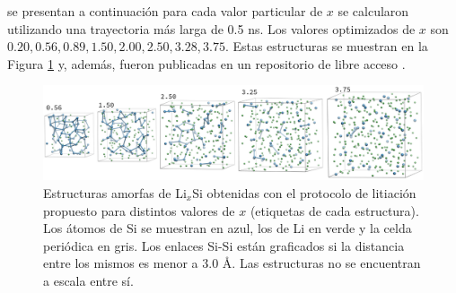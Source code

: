 se presentan a continuación para cada valor particular de $x$ se calcularon 
utilizando una trayectoria más larga de 0.5 ns. Los valores optimizados de $x$
son $0.20, 0.56, 0.89, 1.50, 2.00, 2.50, 3.28, 3.75$. Estas estructuras se 
muestran en la Figura \ref{fig:litiacion} y, además, fueron publicadas en un 
repositorio de libre acceso \cite{dftb_lisi_amorphous}.
\begin{figure}[h!]
    \centering
    \includegraphics[width=\textwidth]{Silicio/prediccion/metodos/litiacion.png}
    \caption{Estructuras amorfas de Li$_x$Si obtenidas con el protocolo de litiación
    propuesto para distintos valores de $x$ (etiquetas de cada estructura). Los 
    átomos de Si se muestran en azul, los de Li en verde y la celda periódica en 
    gris. Los enlaces Si-Si están graficados si la distancia entre los mismos es
    menor a 3.0 \AA. Las estructuras no se encuentran a escala entre sí.}
    \label{fig:litiacion}
\end{figure}
